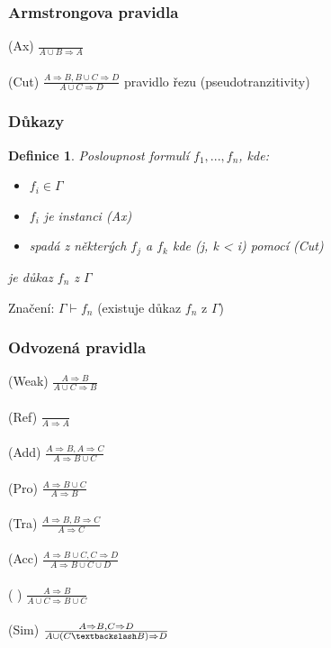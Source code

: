 \documentclass[10pt,a4paper]{article}
\newtheorem{definition}{Definice}
\begin{document}
\subsubsection{Armstrongova pravidla}

(Ax) $\frac{}{A \cup B \Rightarrow A}$\\\\
(Cut) $ \frac{A \Rightarrow B, B \cup C \Rightarrow D}{A \cup C \Rightarrow D}$
	pravidlo řezu (pseudotranzitivity)
\subsubsection{Důkazy}

\begin{definition}
Posloupnost formulí $f_1, ...,f_n$, kde:
\begin{itemize}
\item $f_i \in \Gamma$
\item $f_i$ je instanci (Ax)
\item spadá z některých $f_j$ a $f_k$ kde (j, k < i) pomocí (Cut)
\end{itemize}
je důkaz $f_n$ z $\Gamma$
\end{definition}

Značení: $\Gamma \vdash f_n$ (existuje důkaz $f_n$ z $\Gamma$)

\subsubsection{Odvozená pravidla}

(Weak) $\frac{A \Rightarrow B}{A \cup C \Rightarrow B}$\\\\
(Ref) $ \frac{}{A \Rightarrow A}$\\\\
(Add) $\frac{A \Rightarrow B, A \Rightarrow C}{A \Rightarrow B \cup C}$\\\\
(Pro) $ \frac{A \Rightarrow B \cup C}{A \Rightarrow B}$\\\\
(Tra) $ \frac{A \Rightarrow B, B \Rightarrow C}{A \Rightarrow C}$\\\\
(Acc) $ \frac{A \Rightarrow B \cup C, C \Rightarrow D}{A \Rightarrow B \cup C \cup D}$\\\\
(   ) $ \frac{A \Rightarrow B}{A \cup C \Rightarrow B \cup C}$\\\\
(Sim) $ \frac{A \Rightarrow B, C \Rightarrow D}{A \cup (C \textbackslash B) \Rightarrow D}$\\\\
\end{document}
